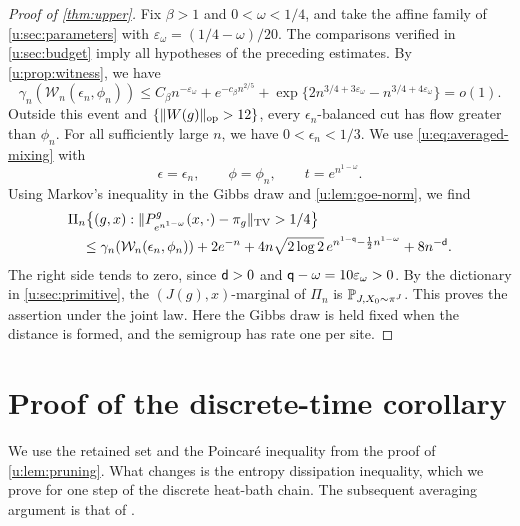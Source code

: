 \begin{proof}[Proof of \cref{thm:upper}]
Fix $\beta>1$ and $0<\omega<1/4$, and take the affine family of
\cref{u:sec:parameters} with $\varepsilon_\omega=(1/4-\omega)/20$.
The comparisons verified in \cref{u:sec:budget} imply all hypotheses
of the preceding estimates. By \cref{u:prop:witness}, we have
\begin{equation}\label{u:eq:witness-family}
 \gamma_n(\mathcal W_n(\epsilon_n,\phi_n))
 \le C_\beta n^{-\varepsilon_\omega}+e^{-c_\beta n^{2/5}}
       +\exp\{2n^{3/4+3\varepsilon_\omega}
                    -n^{3/4+4\varepsilon_\omega}\}=o(1).
\end{equation}
Outside this event and $\{\lVert W(g)\rVert_{\mathrm{op}}>12\}$, every
$\epsilon_n$-balanced cut has flow greater than $\phi_n$. For all
sufficiently large $n$, we have $0<\epsilon_n<1/3$. We use
\eqref{u:eq:averaged-mixing} with
\[
 \epsilon=\epsilon_n,\qquad \phi=\phi_n,
 \qquad t=e^{n^{1-\omega}}.
\]
Using Markov's inequality in the Gibbs draw and
\cref{u:lem:goe-norm}, we find
\begin{equation}\label{u:eq:joint-bad-start}
 \begin{split}
 &\Pi_n\bigl\{(g,x):
       \lVert P_{e^{n^{1-\omega}}}^g(x,\cdot)-\pi_g\rVert_{\mathrm{TV}}>1/4\bigr\}\\
 &\quad\le\gamma_n(\mathcal W_n(\epsilon_n,\phi_n))+2e^{-n}
       +4n\sqrt{2\log2}\,
          e^{n^{1-\mathsf{q}}-\frac12n^{1-\omega}}+8n^{-\mathsf{d}}.
 \end{split}
\end{equation}
The right side tends to zero, since $\mathsf{d}>0$ and
$\mathsf{q}-\omega=10\varepsilon_\omega>0$. By the dictionary in
\cref{u:sec:primitive}, the $(J(g),x)$-marginal of $\Pi_n$ is
$\mathbb P_{J,X_0\sim\pi^J}$. This proves the assertion under the joint law.
Here the Gibbs draw is held fixed when the distance is formed, and
the semigroup has rate one per site.
\end{proof}

\section{Proof of the discrete-time corollary}\label{u:sec:proof-discrete}

We use the retained set and the Poincar\'e inequality from the proof of
\cref{u:lem:pruning}. What changes is the entropy dissipation
inequality, which we prove for one step of the discrete heat-bath chain. The subsequent averaging argument
is that of \cite[Section~7, Lemma~8]{oai-typical-upper}.

